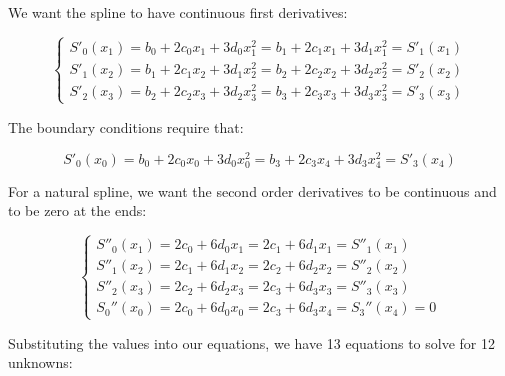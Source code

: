 \documentclass[11pt]{article}
\begin{document}
    We want the spline to have continuous first derivatives:

\[\left\{ \begin{array}{ll}
            S'_0(x_1) = b_0 + 2 c_0 x_1 + 3 d_0 x_1^2 = b_1 + 2 c_1 x_1 + 3 d_1 x_1^2 = S'_1(x_1)\\
            S'_1(x_2) = b_1 + 2 c_1 x_2 + 3 d_1 x_2^2 = b_2 + 2 c_2 x_2 + 3 d_2 x_2^2 = S'_2(x_2)\\
            S'_2(x_3) = b_2 + 2 c_2 x_3 + 3 d_2 x_3^2 = b_3 + 2 c_3 x_3 + 3 d_3 x_3^2 = S'_3(x_3)
            \end{array} \right.\]

The boundary conditions require that:

\[S'_0(x_0) = b_0 + 2 c_0 x_0 + 3 d_0 x_0^2 = b_3 + 2 c_3 x_4 + 3 d_3 x_4^2 = S'_3(x_4)\]

    For a natural spline, we want the second order derivatives to be
continuous and to be zero at the ends:

\[\left\{ \begin{array}{ll}
            S''_0(x_1) = 2 c_0 + 6 d_0 x_1 = 2 c_1 + 6 d_1 x_1 = S''_1(x_1)\\
            S''_1(x_2) = 2 c_1 + 6 d_1 x_2 = 2 c_2 + 6 d_2 x_2 = S''_2(x_2)\\
            S''_2(x_3) = 2 c_2 + 6 d_2 x_3 = 2 c_3 + 6 d_3 x_3 = S''_3(x_3)\\
            S_0''(x_0) = 2 c_0 + 6 d_0 x_0 = 2 c_3 + 6 d_3 x_4 = S_3''(x_4) = 0
            \end{array} \right.\]

    Substituting the values into our equations, we have 13 equations to
solve for 12 unknowns:
\end{document}
